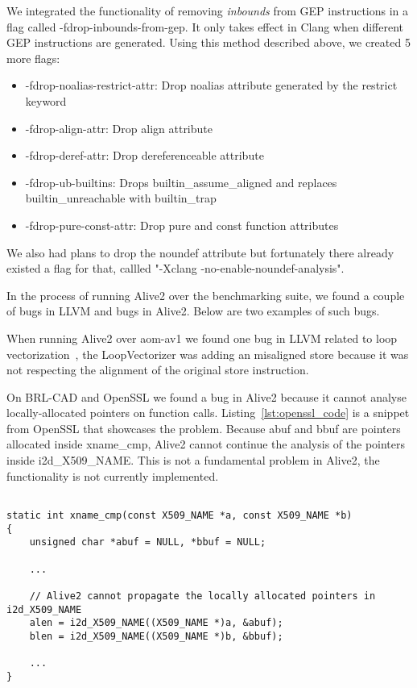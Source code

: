 We integrated the functionality of removing \textit{inbounds} from GEP
instructions in a flag called -fdrop-inbounds-from-gep. It only takes effect in
Clang when different GEP instructions are generated. Using this method described
above, we created 5 more flags:

\begin{itemize}
  \item -fdrop-noalias-restrict-attr: Drop noalias attribute generated by the
restrict keyword
  \item -fdrop-align-attr: Drop align attribute
  \item -fdrop-deref-attr: Drop dereferenceable attribute
  \item -fdrop-ub-builtins: Drops builtin_assume_aligned and replaces builtin_unreachable with builtin_trap
  \item -fdrop-pure-const-attr: Drop pure and const function attributes
\end{itemize}

We also had plans to drop the noundef attribute but fortunately there already
existed a flag for that, callled "-Xclang -no-enable-noundef-analysis".

In the process of running Alive2 over the benchmarking suite, we found a couple
of bugs in LLVM and bugs in Alive2. Below are two examples of such bugs.

When running Alive2 over aom-av1 we found one bug in LLVM related to loop
vectorization~\cite{loopvectbug}, the LoopVectorizer was adding an misaligned
store because it was not respecting the alignment of the original store
instruction.

On BRL-CAD and OpenSSL we found a bug in Alive2 because it cannot analyse
locally-allocated pointers on function calls. Listing~\ref{lst:openssl_code} is
a snippet from OpenSSL that showcases the problem. Because abuf and bbuf are
pointers allocated inside xname_cmp, Alive2 cannot continue the analysis of the
pointers inside i2d_X509_NAME. This is not a fundamental problem in Alive2, the
functionality is not currently implemented.

\begin{lstlisting}[style=Cstyle, caption={OpenSSL code that was causing Alive2 bug}, label={lst:openssl_code}]

static int xname_cmp(const X509_NAME *a, const X509_NAME *b)
{
    unsigned char *abuf = NULL, *bbuf = NULL;

    ...

    // Alive2 cannot propagate the locally allocated pointers in i2d_X509_NAME
    alen = i2d_X509_NAME((X509_NAME *)a, &abuf);
    blen = i2d_X509_NAME((X509_NAME *)b, &bbuf);

    ...
}

\end{lstlisting}
